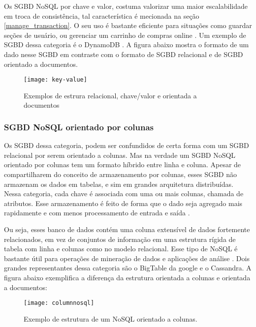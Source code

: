 	Os SGBD NoSQL por chave e valor, costuma valorizar uma maior escalabilidade em troca de consistência, tal característica é mecionada na seção \ref{manage_transaction}. O seu uso é bastante eficiente para situações como guardar seções de usuário, ou gerenciar um carrinho de compras online \cite{nayak2013type}. Um exemplo de SGBD dessa categoria é o DynamoDB \cite{DeCandia:2007:DAH:1323293.1294281}. A figura abaixo mostra o formato de um dado nesse SGBD em contraste com o formato de SGBD relacional e de SGBD orientado a documentos.
	
\begin{figure}[h]
	\centering
    \texttt{[image: key-value]}
    \caption{Exemplos de estrura relacional, chave/valor e orientada a documentos}
    \label{fig:key-value}
\end{figure}
	
\subsubsection{SGBD NoSQL orientado por colunas}
	Os SGBD dessa categoria, podem ser confundidos de certa forma com um SGBD relacional por serem orientado a colunas. Mas na verdade um SGBD NoSQL orientado por colunas tem um formato híbrido entre linha e coluna. Apesar de compartilharem do conceito de armazenamento por colunas, esses SGBD não armazenam os dados em tabelas, e sim em grandes arquitetura distribuídas. Nessa categoria, cada chave é associada com uma ou mais colunas, chamada de atributos. Esse armazenamento é feito de forma que o dado seja agregado mais rapidamente e com menos processamento de entrada e saída \cite{nayak2013type}.
	
	Ou seja, esses banco de dados contém uma coluna extensível de dados fortemente relacionados, em vez de conjuntos de informação em uma estrutura rígida de tabela com linha e colunas como no modelo relacional\cite{kauremerging}. Esse tipo de NoSQL é bastante útil para operações de mineração de dados e aplicações de análise \cite{nayak2013type}. Dois grandes representantes dessa categoria são o BigTable da google \cite{Chang:2008:BDS:1365815.1365816} e o Cassandra. A figura abaixo exemplifica a diferença da estrutura orientada a colunas e orientada a documentos:
	
\begin{figure}[h]
	\centering
    \texttt{[image: columnnosql]}
    \caption{Exemplo de estrutura de um NoSQL orientado a colunas.}
    \label{fig:columnnosql}
\end{figure}
	
